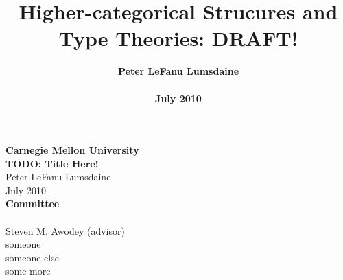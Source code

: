 \documentclass{amsbook}
\begin{document}
\frontmatter


\title[Higher-categorical Structures and Type Theories]{Higher-categorical Strucures and Type Theories: DRAFT!}

\author[P. LeF. Lumsdaine]{{\large\bf Peter LeFanu Lumsdaine}\\~\\\normalsize
  \bf July 2010}

\maketitle
\newpage
\thispagestyle{empty}
\begin{center}
  {\Large\textbf{Carnegie Mellon University}}\\
  \vspace{1cm}
  {\large\textbf{TODO: Title Here!}}\\
  \vspace{.5cm}
  Peter LeFanu Lumsdaine\\
  \vspace{.5cm}
  July 2010\\
  \vspace{3cm}
  \textbf{Committee}\\~\\
  Steven M. Awodey (advisor)\\
  someone \\
  someone else \\
  some more \\

\end{center}
 
\setcounter{page}{3}




\tableofcontents





%
%



\mainmatter




\end{document}
